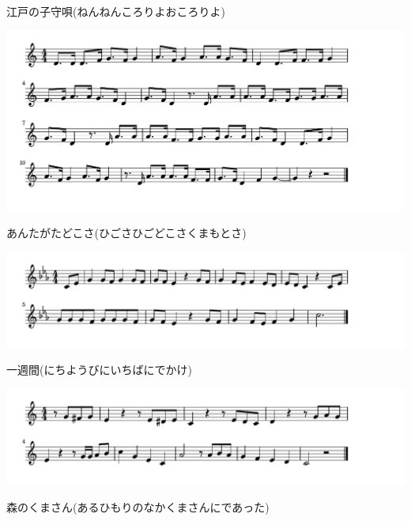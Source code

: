 \documentclass[a4paper]{ltjsarticle}
\begin{document}
\vspace{-10mm} \hspace{10mm}
江戸の子守唄(ねんねんころりよおころりよ)

\includegraphics[clip]{antagata_crop.pdf}

\vspace{-10mm} \hspace{10mm}
あんたがたどこさ(ひごさひごどこさくまもとさ)

\includegraphics[clip]{isshukan_crop.pdf}

\vspace{-10mm} \hspace{10mm}
一週間(にちようびにいちばにでかけ)

\includegraphics[clip]{morinokuma_crop.pdf}

\vspace{-10mm} \hspace{10mm}
森のくまさん(あるひもりのなかくまさんにであった)
\end{document}
